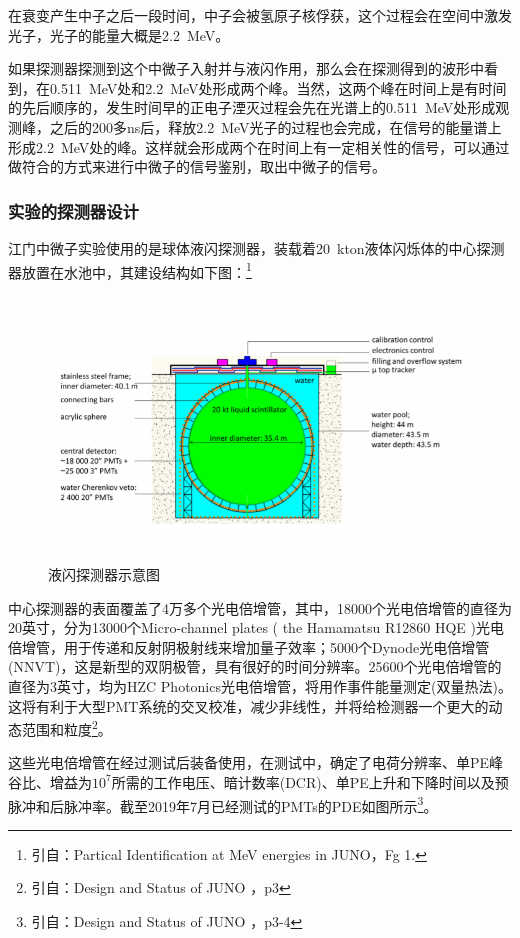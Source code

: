 \documentclass[10pt,a4paper]{article}
\begin{document}
在衰变产生中子之后一段时间，中子会被氢原子核俘获，这个过程会在空间中激发光子，光子的能量大概是\SI{2.2}{MeV}。

如果探测器探测到这个中微子入射并与液闪作用，那么会在探测得到的波形中看到，在\SI{0.511}{MeV}处和\SI{2.2}{MeV}处形成两个峰。当然，这两个峰在时间上是有时间的先后顺序的，发生时间早的正电子湮灭过程会先在光谱上的\SI{0.511}{MeV}处形成观测峰，之后的200多ns后，释放\SI{2.2}{MeV}光子的过程也会完成，在信号的能量谱上形成\SI{2.2}{MeV}处的峰。这样就会形成两个在时间上有一定相关性的信号，可以通过做符合的方式来进行中微子的信号鉴别，取出中微子的信号。

\subsubsection{实验的探测器设计}\label{sub:logicinter}

江门中微子实验使用的是球体液闪探测器，装载着\SI{20}{kton}液体闪烁体的中心探测器放置在水池中，其建设结构如下图：\footnote{引自：Partical Identification at MeV energies in JUNO，Fg 1.}

\begin{figure}[ht]
 \centering
 \includegraphics[height=7cm]{images/探测器示意图.png}
 \caption{液闪探测器示意图}
 \label{fig:singleblock}
\end{figure}

中心探测器的表面覆盖了4万多个光电倍增管，其中，18000个光电倍增管的直径为20英寸，分为13000个Micro-channel plates ( the Hamamatsu R12860 HQE )光电倍增管，用于传递和反射阴极射线来增加量子效率；5000个Dynode光电倍增管(NNVT)，这是新型的双阴极管，具有很好的时间分辨率。25600个光电倍增管的直径为3英寸，均为HZC Photonics光电倍增管，将用作事件能量测定(双量热法)。这将有利于大型PMT系统的交叉校准，减少非线性，并将给检测器一个更大的动态范围和粒度\footnote{引自：Design and Status of JUNO ，p3}。

这些光电倍增管在经过测试后装备使用，在测试中，确定了电荷分辨率、单PE峰谷比、增益为$10^7$所需的工作电压、暗计数率(DCR)、单PE上升和下降时间以及预脉冲和后脉冲率。截至2019年7月已经测试的PMTs的PDE如图所示\footnote{引自：Design and Status of JUNO ，p3-4}。
\end{document}
